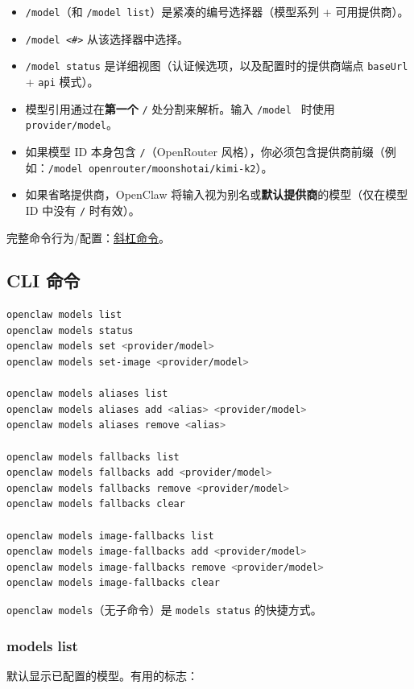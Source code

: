 \begin{itemize}
  \item \texttt{/model}（和 \texttt{/model list}）是紧凑的编号选择器（模型系列 + 可用提供商）。
  \item \texttt{/model <\#>} 从该选择器中选择。
  \item \texttt{/model status} 是详细视图（认证候选项，以及配置时的提供商端点 \texttt{baseUrl} + \texttt{api} 模式）。
  \item 模型引用通过在\textbf{第一个} \texttt{/} 处分割来解析。输入 \texttt{/model } 时使用 \texttt{provider/model}。
  \item 如果模型 ID 本身包含 \texttt{/}（OpenRouter 风格），你必须包含提供商前缀（例如：\texttt{/model openrouter/moonshotai/kimi-k2}）。
  \item 如果省略提供商，OpenClaw 将输入视为别名或\textbf{默认提供商}的模型（仅在模型 ID 中没有 \texttt{/} 时有效）。
\end{itemize}


完整命令行为/配置：\href{/tools/slash-commands}{斜杠命令}。

\subsection{CLI 命令}


\begin{lstlisting}[language=bash]
openclaw models list
openclaw models status
openclaw models set <provider/model>
openclaw models set-image <provider/model>

openclaw models aliases list
openclaw models aliases add <alias> <provider/model>
openclaw models aliases remove <alias>

openclaw models fallbacks list
openclaw models fallbacks add <provider/model>
openclaw models fallbacks remove <provider/model>
openclaw models fallbacks clear

openclaw models image-fallbacks list
openclaw models image-fallbacks add <provider/model>
openclaw models image-fallbacks remove <provider/model>
openclaw models image-fallbacks clear
\end{lstlisting}


\texttt{openclaw models}（无子命令）是 \texttt{models status} 的快捷方式。

\subsubsection{models list}


默认显示已配置的模型。有用的标志：

